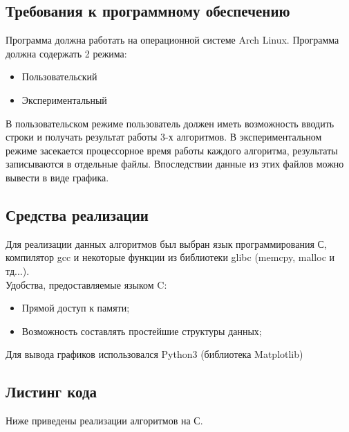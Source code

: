 \documentclass[a4paper,12pt]{article}
\begin{document}
\begin{flushleft}
\subsection{Требования к программному обеспечению}

\begin{flushleft}
Программа должна работать на операционной системе Arch Linux. Программа должна
содержать 2 режима:
\begin{itemize}
\item Пользовательский
\item Экспериментальный
\end{itemize}
В пользовательском режиме пользователь должен иметь возможность вводить строки и получать результат работы 3-х алгоритмов. В экспериментальном режиме засекается процессорное время работы каждого алгоритма, результаты записываются в отдельные файлы. Впоследствии данные из этих файлов можно вывести в виде графика.
\end{flushleft}

\newpage
\subsection{Средства реализации}
Для реализации данных алгоритмов был выбран язык программирования С, компилятор
gcc и некоторые функции из библиотеки glibc (memcpy, malloc и тд...). \\
Удобства, предоставляемые языком C:
\begin{itemize}
\item Прямой доступ к памяти;
\item Возможность составлять простейшие структуры данных;
\end{itemize}
Для вывода графиков использовался Python3 (библиотека Matplotlib)

\newpage
\subsection{Листинг кода}
Ниже приведены реализации алгоритмов на С.\\

%
\newpage
%
\newpage
%


\end{flushleft}
\end{document}
